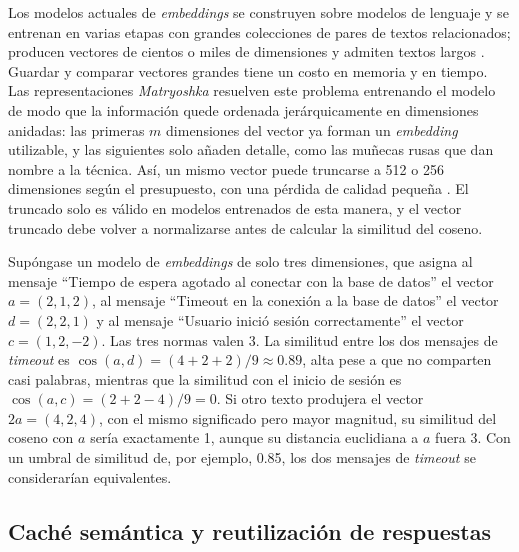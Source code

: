 Los modelos actuales de \textit{embeddings} se construyen sobre modelos de lenguaje y se entrenan en varias etapas con grandes colecciones de pares de textos relacionados; producen vectores de cientos o miles de dimensiones y admiten textos largos \cite{zhang2025_qwen3emb}. Guardar y comparar vectores grandes tiene un costo en memoria y en tiempo. Las representaciones \textit{Matryoshka} resuelven este problema entrenando el modelo de modo que la información quede ordenada jerárquicamente en dimensiones anidadas: las primeras $m$ dimensiones del vector ya forman un \textit{embedding} utilizable, y las siguientes solo añaden detalle, como las muñecas rusas que dan nombre a la técnica. Así, un mismo vector puede truncarse a 512 o 256 dimensiones según el presupuesto, con una pérdida de calidad pequeña \cite{kusupati2022_matryoshka}. El truncado solo es válido en modelos entrenados de esta manera, y el vector truncado debe volver a normalizarse antes de calcular la similitud del coseno.

Supóngase un modelo de \textit{embeddings} de solo tres dimensiones, que asigna al mensaje ``Tiempo de espera agotado al conectar con la base de datos'' el vector $a = (2, 1, 2)$, al mensaje ``Timeout en la conexión a la base de datos'' el vector $d = (2, 2, 1)$ y al mensaje ``Usuario inició sesión correctamente'' el vector $c = (1, 2, -2)$. Las tres normas valen 3. La similitud entre los dos mensajes de \textit{timeout} es $\cos(a, d) = (4 + 2 + 2)/9 \approx 0.89$, alta pese a que no comparten casi palabras, mientras que la similitud con el inicio de sesión es $\cos(a, c) = (2 + 2 - 4)/9 = 0$. Si otro texto produjera el vector $2a = (4, 2, 4)$, con el mismo significado pero mayor magnitud, su similitud del coseno con $a$ sería exactamente 1, aunque su distancia euclidiana a $a$ fuera 3. Con un umbral de similitud de, por ejemplo, 0.85, los dos mensajes de \textit{timeout} se considerarían equivalentes.

\subsection{Caché semántica y reutilización de respuestas}\label{sec:mt_cache}

